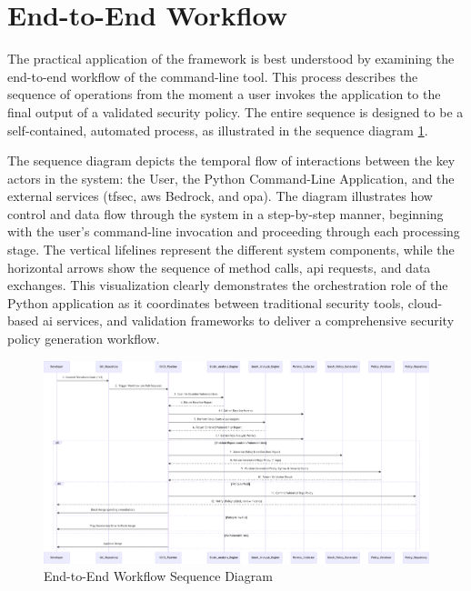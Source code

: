\section{End-to-End Workflow}


The practical application of the framework is best understood by examining the end-to-end workflow of the command-line tool. This process describes the sequence of operations from the moment a user invokes the application to the final output of a validated security policy. The entire sequence is designed to be a self-contained, automated process, as illustrated in the sequence diagram \ref{fig:e2e_workflow}.

The sequence diagram depicts the temporal flow of interactions between the key actors in the system: the User, the Python Command-Line Application, and the external services (tfsec, \gls{aws} Bedrock, and \gls{opa}). The diagram illustrates how control and data flow through the system in a step-by-step manner, beginning with the user's command-line invocation and proceeding through each processing stage. The vertical lifelines represent the different system components, while the horizontal arrows show the sequence of method calls, \gls{api} requests, and data exchanges. This visualization clearly demonstrates the \gls{orchestration} role of the Python application as it coordinates between traditional security tools, cloud-based \gls{ai} services, and validation frameworks to deliver a comprehensive security policy generation workflow.

\begin{landscape}
\thispagestyle{empty}
\begin{figure}[p]
\centering
\includegraphics[width=0.9\linewidth,height=0.7\textheight,keepaspectratio]{Figures/image.pdf}
\caption{End-to-End Workflow Sequence Diagram}
\label{fig:e2e_workflow}
\end{figure}
\end{landscape}

